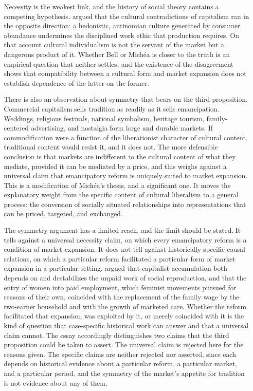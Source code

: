 \documentclass[12pt]{article}
\begin{document}
Necessity is the weakest link, and the history of social theory contains a competing hypothesis. \citet{bell} argued that the cultural contradictions of capitalism ran in the opposite direction: a hedonistic, antinomian culture generated by consumer abundance undermines the disciplined work ethic that production requires. On that account cultural individualism is not the servant of the market but a dangerous product of it. Whether Bell or Michéa is closer to the truth is an empirical question that neither settles, and the existence of the disagreement shows that compatibility between a cultural form and market expansion does not establish dependence of the latter on the former.

There is also an observation about symmetry that bears on the third proposition. Commercial capitalism sells tradition as readily as it sells emancipation. Weddings, religious festivals, national symbolism, heritage tourism, family-centered advertising, and nostalgia form large and durable markets. If commodification were a function of the liberationist character of cultural content, traditional content would resist it, and it does not. The more defensible conclusion is that markets are indifferent to the cultural content of what they mediate, provided it can be mediated by a price, and this weighs against a universal claim that emancipatory reform is uniquely suited to market expansion. This is a modification of Michéa's thesis, and a significant one. It moves the explanatory weight from the specific content of cultural liberalism to a general process: the conversion of socially situated relationships into representations that can be priced, targeted, and exchanged.

The symmetry argument has a limited reach, and the limit should be stated. It tells against a universal necessity claim, on which every emancipatory reform is a condition of market expansion. It does not tell against historically specific causal relations, on which a particular reform facilitated a particular form of market expansion in a particular setting. \citet{fraser2016} argued that capitalist accumulation both depends on and destabilizes the unpaid work of social reproduction, and that the entry of women into paid employment, which feminist movements pursued for reasons of their own, coincided with the replacement of the family wage by the two-earner household and with the growth of marketed care. Whether the reform facilitated that expansion, was exploited by it, or merely coincided with it is the kind of question that case-specific historical work can answer and that a universal claim cannot. The essay accordingly distinguishes two claims that the third proposition could be taken to assert. The universal claim is rejected here for the reasons given. The specific claims are neither rejected nor asserted, since each depends on historical evidence about a particular reform, a particular market, and a particular period, and the symmetry of the market's appetite for tradition is not evidence about any of them.
\end{document}
